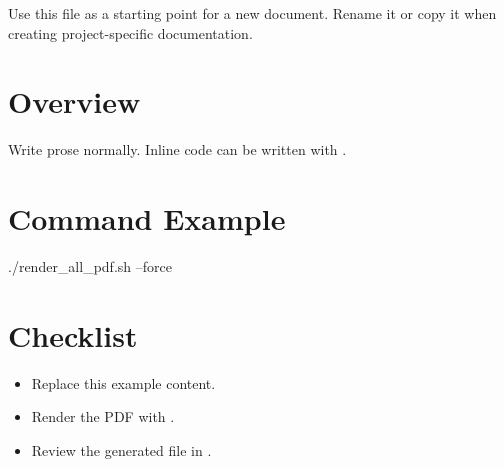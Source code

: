

Use this file as a starting point for a new document. Rename it or copy it
when creating project-specific documentation.

\section{Overview}

Write prose normally. Inline code can be written with .

\section{Command Example}

\begin{DocCode}
./render_all_pdf.sh --force
\end{DocCode}

\section{Checklist}

\begin{itemize}
  \item Replace this example content.
  \item Render the PDF with .
  \item Review the generated file in .
\end{itemize}



